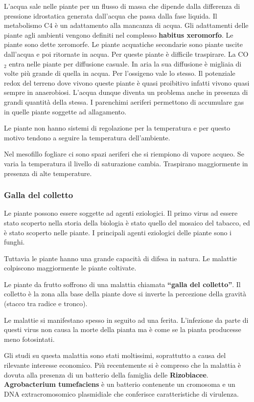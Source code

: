 \documentclass[]{article}
\begin{document}
L'acqua sale nelle piante per un flusso di massa che dipende dalla
differenza di pressione idrostatica generata dall'acqua che passa dalla
fase liquida. Il metabolismo C4 è un adattamento alla mancanza di acqua.
Gli adattamenti delle piante agli ambienti vengono definiti nel
complesso \textbf{habitus xeromorfo}. Le piante sono dette xeromorfe. Le
piante acquatiche secondarie sono piante uscite dall'acqua e poi
ritornate in acqua. Per queste piante è difficile traspirare. La CO$_2$
entra nelle piante per diffusione casuale. In aria la sua diffusione è
migliaia di volte più grande di quella in acqua. Per l'ossigeno vale lo
stesso. Il potenziale redox del terreno dove vivono queste piante è
quasi proibitivo infatti vivono quasi sempre in anaerobiosi. L'acqua
dunque diventa un problema anche in presenza di grandi quantità della
stessa. I parenchimi aeriferi permettono di accumulare gas in quelle
piante soggette ad allagamento.

Le piante non hanno sistemi di regolazione per la temperatura e per
questo motivo tendono a seguire la temperatura dell'ambiente.

Nel mesofillo fogliare ci sono spazi aeriferi che si riempiono di vapore
acqueo. Se varia la temperatura il livello di saturazione cambia.
Traspirano maggiormente in presenza di alte temperature.

\subsubsection{Galla del colletto}\label{galla-del-colletto}

Le piante possono essere soggette ad agenti eziologici. Il primo virus
ad essere stato scoperto nella storia della biologia è stato quello del
mosaico del tabacco, ed è stato scoperto nelle piante. I principali
agenti eziologici delle piante sono i funghi.

Tuttavia le piante hanno una grande capacità di difesa in natura. Le
malattie colpiscono maggiormente le piante coltivate.

Le piante da frutto soffrono di una malattia chiamata \textbf{``galla
del colletto''}. Il colletto è la zona alla base della piante dove si
inverte la percezione della gravità (stacco tra radice e tronco).

Le malattie si manifestano spesso in seguito ad una ferita. L'infezione
da parte di questi virus non causa la morte della pianta ma è come se la
pianta producesse meno fotosintati.

Gli studi su questa malattia sono stati moltissimi, soprattutto a causa
del rilevante interesse economico. Più recentemente si è compreso che la
malattia è dovuta alla presenza di un batterio della famiglia delle
\textbf{Rizobiacee}. \textbf{Agrobacterium tumefaciens} è un batterio
contenente un cromosoma e un DNA extracromosomico plasmidiale che
conferisce caratteristiche di virulenza.
\end{document}

